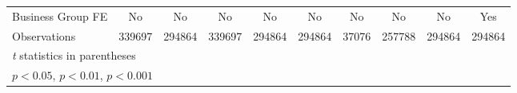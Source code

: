 {\begin{tabular}{l*{9}{c}}
Business Group FE&       No         &       No         &       No         &       No         &       No         &       No         &       No         &       No         &      Yes         \\
Observations    &   339697         &   294864         &   339697         &   294864         &   294864         &    37076         &   257788         &   294864         &   294864         \\
\hline\hline
\multicolumn{10}{l}{\footnotesize \textit{t} statistics in parentheses}\\
\multicolumn{10}{l}{\footnotesize \sym{*} \(p<0.05\), \sym{**} \(p<0.01\), \sym{***} \(p<0.001\)}\\
\end{tabular}
}
